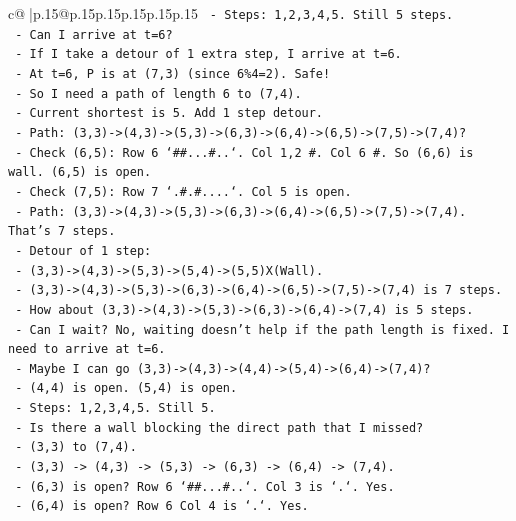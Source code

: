 \documentclass{article}
\begin{document}
{\begin{supertabular}{c@{$\;$}|p{.15\linewidth}@{}p{.15\linewidth}p{.15\linewidth}p{.15\linewidth}p{.15\linewidth}p{.15\linewidth}}
{{{\texttt{    {-} Steps: 1,2,3,4,5. Still 5 steps.} \\
\texttt{  {-} Can I arrive at t=6?} \\
\texttt{    {-} If I take a detour of 1 extra step, I arrive at t=6.} \\
\texttt{    {-} At t=6, P is at (7,3) (since 6\%4=2). Safe!} \\
\texttt{    {-} So I need a path of length 6 to (7,4).} \\
\texttt{    {-} Current shortest is 5. Add 1 step detour.} \\
\texttt{    {-} Path: (3,3){-}>(4,3){-}>(5,3){-}>(6,3){-}>(6,4){-}>(6,5){-}>(7,5){-}>(7,4)?} \\
\texttt{      {-} Check (6,5): Row 6 `\#\#...\#..`. Col 1,2 \#. Col 6 \#. So (6,6) is wall. (6,5) is open.} \\
\texttt{      {-} Check (7,5): Row 7 `.\#.\#....`. Col 5 is open.} \\
\texttt{      {-} Path: (3,3){-}>(4,3){-}>(5,3){-}>(6,3){-}>(6,4){-}>(6,5){-}>(7,5){-}>(7,4). That's 7 steps.} \\
\texttt{    {-} Detour of 1 step:} \\
\texttt{      {-} (3,3){-}>(4,3){-}>(5,3){-}>(5,4){-}>(5,5)X(Wall).} \\
\texttt{      {-} (3,3){-}>(4,3){-}>(5,3){-}>(6,3){-}>(6,4){-}>(6,5){-}>(7,5){-}>(7,4) is 7 steps.} \\
\texttt{      {-} How about (3,3){-}>(4,3){-}>(5,3){-}>(6,3){-}>(6,4){-}>(7,4) is 5 steps.} \\
\texttt{      {-} Can I wait? No, waiting doesn't help if the path length is fixed. I need to arrive at t=6.} \\
\texttt{      {-} Maybe I can go (3,3){-}>(4,3){-}>(4,4){-}>(5,4){-}>(6,4){-}>(7,4)?} \\
\texttt{        {-} (4,4) is open. (5,4) is open.} \\
\texttt{        {-} Steps: 1,2,3,4,5. Still 5.} \\
\texttt{      {-} Is there a wall blocking the direct path that I missed?} \\
\texttt{        {-} (3,3) to (7,4).} \\
\texttt{        {-} (3,3) {-}> (4,3) {-}> (5,3) {-}> (6,3) {-}> (6,4) {-}> (7,4).} \\
\texttt{        {-} (6,3) is open? Row 6 `\#\#...\#..`. Col 3 is `.`. Yes.} \\
\texttt{        {-} (6,4) is open? Row 6 Col 4 is `.`. Yes.} \\
}}}
\end{supertabular}}
\end{document}
